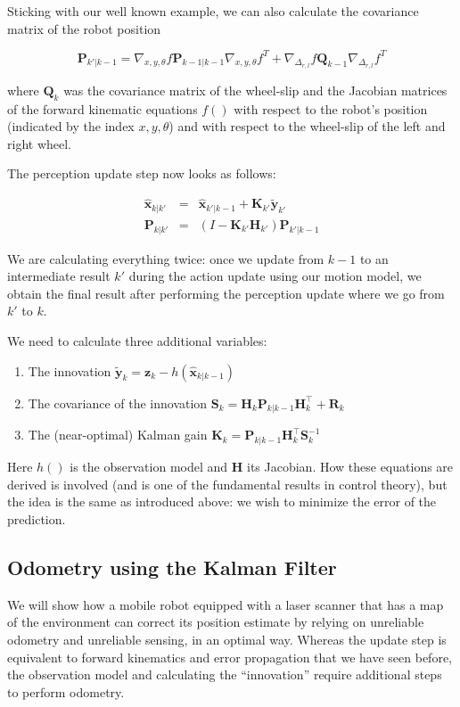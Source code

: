 Sticking with our well known example, we can also calculate the covariance matrix of the robot position

\begin{equation}
\boldsymbol{P}_{k'|k-1} = \nabla_{x,y,\theta}f \boldsymbol{P}_{k-1|k-1}\nabla_{x,y,\theta}f^T + \nabla_{\Delta_{r,l}}f\boldsymbol{Q}_{k-1}\nabla_{\Delta_{r,l}}f^T
\end{equation}

where $ \boldsymbol{Q}_k$ was the covariance matrix of the wheel-slip and the Jacobian matrices of the forward kinematic equations $ f()$ with respect to the robot's position (indicated by the index $ x,y,\theta$) and with respect to the wheel-slip of the left and right wheel.

The perception update step now looks as follows:

\begin{eqnarray}
\hat{\boldsymbol{x}}_{k|k'} &=& \hat{\boldsymbol{x}}_{k'|k-1} + \boldsymbol{K}_{k'}\tilde{\boldsymbol{y}}_{k'}\\
\boldsymbol{P}_{k|k'} &=& (I - \boldsymbol{K}_{k'} {\boldsymbol{H}_{k'}}) \boldsymbol{P}_{k'|k-1}
\end{eqnarray}

We are calculating everything twice: once we update from $ k-1$ to an intermediate result $ k'$ during the action update using our motion model, we obtain the final result after performing the perception update where we go from $ k'$ to $ k$.

We need to calculate three additional variables:
\begin{enumerate}
\item The innovation $ \tilde{\boldsymbol{y}}_{k}=\boldsymbol{z}_{k}-h(\hat{\boldsymbol{x}}_{k|k-1})$
\item The covariance of the innovation $\boldsymbol{S}_{k}={\boldsymbol{H}_{k}}\boldsymbol{P}_{k|k-1}{\boldsymbol{H}_{k}^\top}+\boldsymbol{R}_{k}$
\item The (near-optimal)  Kalman gain $ \boldsymbol{K}_{k}=\boldsymbol{P}_{k|k-1}{\boldsymbol{H}_{k}^\top}\boldsymbol{S}_{k}^{-1}$
\end{enumerate}
Here $ h()$ is the observation model and $ \boldsymbol{H}$ its Jacobian. How these equations are derived is involved (and is one of the fundamental results in control theory), but the idea is the same as introduced above: we wish to minimize the error of the prediction.

\subsection{Odometry using the Kalman Filter}
We will show how a mobile robot equipped with a laser scanner that has a map of the environment can correct its position estimate by relying on unreliable odometry and unreliable sensing, in an optimal way.
Whereas the update step is equivalent to forward kinematics and error propagation that we have seen before, the observation model and calculating the ``innovation'' require additional steps to perform odometry.

